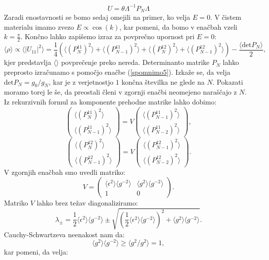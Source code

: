 \begin{appendices}
\begin{equation}
U =  \theta \Lambda^{-1} P_N \Lambda
\end{equation} 
Zaradi enostavnosti se bomo sedaj omejili na primer, ko velja $E=0$. V čistem materialu imamo zvezo $E \propto \cos (k)$, kar pomeni, da bomo v enačbah vzeli $k=\frac{\pi}{2}$.
Končno lahko zapišemo izraz za povprečno upornost pri $E=0$:
\begin{equation}
\langle \rho \rangle \propto \langle|U_{11}|^2 \rangle =  \frac{1}{4} \left( \langle (P_N^{11})^2 \rangle + \langle (P_{N-1}^{11})^2 \rangle +   \langle (P_N^{12})^2 \rangle +  \langle (P_{N-1}^{12})^2 \rangle \right) - \frac{\langle \mathrm{det} P_N \rangle}{2},
\end{equation}
kjer predstavlja $\langle \rangle$ povprečenje preko nereda. Determinanto matrike $P_N$ lahko preprosto izračunamo s pomočjo enačbe (\ref{spomnimo5}). Izkaže se, da velja $\mathrm{det}P_N = g_0/g_N$, kar je z verjetnostjo $1$ končna številka ne glede na $N$. Pokazati moramo torej le še, da preostali členi v zgornji enačbi neomejeno naraščajo z $N$.
Iz rekurzivnih formul za komponente prehodne matrike lahko dobimo:
\begin{equation}
\begin{pmatrix}  \langle (P_N^{11})^2 \rangle \\ \langle (P_{N-1}^{11})^2 \rangle \end{pmatrix} = V \begin{pmatrix}  \langle (P_{N-1}^{11})^2 \rangle \\  \langle (P_{N-2}^{11})^2 \rangle \end{pmatrix},
\end{equation}
\begin{equation}
\begin{pmatrix} \langle (P_N^{12})^2 \rangle \\ \langle (P_{N-1}^{12})^2 \rangle \end{pmatrix} = V \begin{pmatrix}  \langle (P_{N-1}^{12})^2 \rangle \\  \langle (P_{N-2}^{12})^2 \rangle \end{pmatrix}.
\end{equation}
V zgornjih enačbah smo uvedli matriko:
\begin{equation}
V = \begin{pmatrix} \langle \epsilon^2 \rangle \langle g^{-2} \rangle & \langle g^2 \rangle \langle g^{-2} \rangle \\ 1 & 0 \end{pmatrix}.
\end{equation}
Matriko $V$ lahko brez težav diagonaliziramo:
\begin{equation}
\lambda_\pm = \frac{1}{2} \langle \epsilon^2 \rangle \langle g^{-2} \rangle \pm \sqrt{(\frac{1}{2} \langle \epsilon^2 \rangle \langle g^{-2} \rangle)^2 + \langle g^2 \rangle \langle g^{-2} \rangle}.
\end{equation}
Cauchy-Schwartzeva  neenakost nam da:
\begin{equation}
\langle g^2 \rangle \langle g^{-2} \rangle \geq \langle g^2 / g^2 \rangle = 1,
\end{equation} 
kar pomeni, da velja:


\end{appendices}
